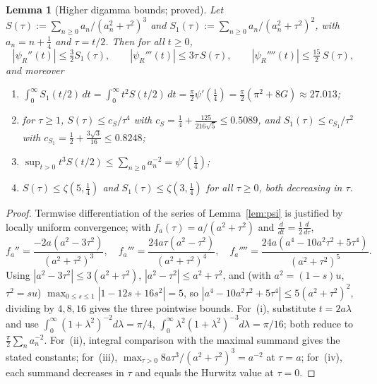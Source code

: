 \documentclass[11pt]{article}
\newtheorem{lemma}[theorem]{Lemma}
\newcommand{\psiR}{\psi_{R}}                %
\begin{document}
\begin{lemma}[Higher digamma bounds; proved]
\label{lem:digamma}
Let $S(\tau):=\sum_{n\ge 0}a_n/(a_n^2+\tau^2)^3$ and
$S_1(\tau):=\sum_{n\ge 0}a_n/(a_n^2+\tau^2)^2$, with $a_n=n+\tfrac14$ and
$\tau=t/2$. Then for all $t\ge 0$,
\[
|\psiR''(t)|\le\tfrac32 S_1(\tau),\qquad
|\psiR'''(t)|\le 3\tau\,S(\tau),\qquad
|\psiR''''(t)|\le\tfrac{15}{2}\,S(\tau),
\]
and moreover
\begin{enumerate}[label=\textup{(\roman*)}]
\item $\displaystyle\int_0^\infty S_1(t/2)\,dt=\int_0^\infty t^2 S(t/2)\,dt
   =\tfrac{\pi}{2}\psi'(\tfrac14)=\tfrac{\pi}{2}(\pi^2+8G)\approx 27.013$;
\item for $\tau\ge 1$, $S(\tau)\le c_S/\tau^4$ with
   $c_S=\tfrac14+\tfrac{125}{216\sqrt5}\le 0.5089$, and
   $S_1(\tau)\le c_{S_1}/\tau^2$ with
   $c_{S_1}=\tfrac12+\tfrac{3\sqrt3}{16}\le 0.8248$;
\item $\displaystyle\sup_{t>0}t^3 S(t/2)\le\sum_{n\ge 0}a_n^{-2}=\psi'(\tfrac14)$;
\item $S(\tau)\le\zeta(5,\tfrac14)$ and $S_1(\tau)\le\zeta(3,\tfrac14)$ for all
   $\tau\ge 0$, both decreasing in $\tau$.
\end{enumerate}
\end{lemma}

\begin{proof}
Termwise differentiation of the series of Lemma~\ref{lem:psi} is justified by
locally uniform convergence; with $f_a(\tau)=a/(a^2+\tau^2)$ and
$\tfrac{d}{dt}=\tfrac12\tfrac{d}{d\tau}$,
\[
f_a''=\frac{-2a(a^2-3\tau^2)}{(a^2+\tau^2)^3},\quad
f_a'''=\frac{24a\tau(a^2-\tau^2)}{(a^2+\tau^2)^4},\quad
f_a''''=\frac{24a(a^4-10a^2\tau^2+5\tau^4)}{(a^2+\tau^2)^5}.
\]
Using $|a^2-3\tau^2|\le 3(a^2+\tau^2)$, $|a^2-\tau^2|\le a^2+\tau^2$, and (with
$a^2=(1-s)u$, $\tau^2=su$) $\max_{0\le s\le 1}|1-12s+16s^2|=5$, so
$|a^4-10a^2\tau^2+5\tau^4|\le 5(a^2+\tau^2)^2$, dividing by $4,8,16$ gives the
three pointwise bounds.
For~(i), substitute $t=2a\lambda$ and use
$\int_0^\infty(1+\lambda^2)^{-2}d\lambda=\pi/4$,
$\int_0^\infty\lambda^2(1+\lambda^2)^{-3}d\lambda=\pi/16$; both reduce to
$\tfrac{\pi}{2}\sum_n a_n^{-2}$.
For~(ii), integral comparison with the maximal summand gives the stated
constants; for~(iii), $\max_{\tau>0}8a\tau^3/(a^2+\tau^2)^3=a^{-2}$ at
$\tau=a$; for~(iv), each summand decreases in $\tau$ and equals the Hurwitz
value at $\tau=0$.
\end{proof}
\end{document}

